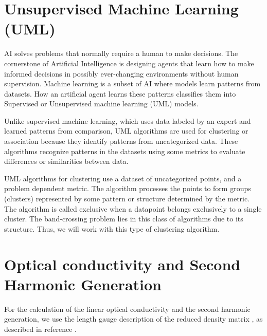 \documentclass[a4paper,12pt]{report}
\begin{document}
\section{Unsupervised Machine Learning (UML)}

AI solves problems that normally require a human to make decisions.
The cornerstone of Artificial Intelligence is designing agents that learn how to make informed decisions in possibly ever-changing environments without human supervision. Machine learning is a subset of AI where models learn patterns from datasets.
How an artificial agent learns these patterns classifies them into Supervised or Unsupervised machine learning (UML) models.

Unlike supervised machine learning, which uses data labeled by an expert and learned patterns from comparison, UML algorithms are used for clustering or association because they identify patterns from uncategorized data.
These algorithms recognize patterns in the datasets using some metrics to evaluate differences or similarities between data.

UML algorithms for clustering use a dataset of uncategorized points, and a  problem dependent metric.
The algorithm processes the points to form groups (clusters) represented by some pattern or structure determined by the metric.
The algorithm is called exclusive when a datapoint belongs exclusively to a single cluster.
The band-crossing problem lies in this class of algorithms due to its structure.
Thus, we will work with this type of clustering algorithm.


\section{Optical conductivity and Second Harmonic Generation}

For the calculation of the linear optical conductivity and the second harmonic generation,
we use the length gauge description of the reduced density matrix \cite{Sipe1995,Sipe2000,Ventura2017},
as described in reference \cite{Ventura2017}.
\end{document}
